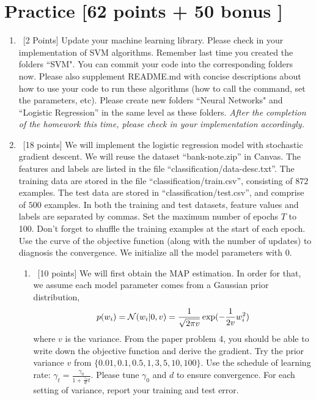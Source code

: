 \documentclass[12pt, fullpage,letterpaper]{article}
\begin{document}
\section{Practice [62 points + 50 bonus ]}
\begin{enumerate}
	\item~[2 Points] Update your machine learning library. Please check in your implementation of SVM algorithms. Remember last time you created the folders ``SVM". You can commit your code into the corresponding folders now. Please also supplement README.md with concise descriptions about how to use your code to run these algorithms (how to call the command, set the parameters, etc). Please create new folders ``Neural Networks" and ``Logistic Regression''  in the same level as these folders.  \textit{After the completion of the homework this time, please check in your implementation accordingly. }

	\item~[18 points] We will implement the logistic regression model with stochastic gradient descent. We will reuse the  dataset ``bank-note.zip'' in Canvas. The features and labels are listed in the file ``classification/data-desc.txt''. The training data are stored in the file ``classification/train.csv'', consisting of $872$ examples. The test data are stored in ``classification/test.csv'', and comprise of $500$ examples. In both the training and test datasets, feature values and labels are separated by commas. Set the maximum number of epochs $T$ to 100. Don't forget to shuffle the training examples at the start of each epoch. Use the curve of the objective function (along with the number of updates) to diagnosis the convergence. We initialize all the model parameters with $0$.
	\begin{enumerate}
		\item~[10 points] We will first obtain the MAP estimation. In order for that, we assume each model parameter comes from a Gaussian prior distribution, 
		\[
		p(w_i ) = \mathcal{N}(w_i |0, v)=\frac{1}{\sqrt{2\pi v}} \exp(-\frac{1}{2v}w_i^2)
		\]
		where $v$ is the variance.  From the paper problem 4, you should be able to write down  the objective function and derive the gradient. Try the prior variance $v$ from $\{0.01, 0.1, 0.5, 1, 3, 5, 10, 100\}$. 
		Use the schedule of learning rate: $\gamma_t = \frac{\gamma_0}{1+\frac{\gamma_0}{d}t}	$. Please tune $\gamma_0$ and $d$ to ensure convergence. For each setting of variance, report your training and test error.
		

\end{enumerate}
\end{enumerate}
\end{document}
